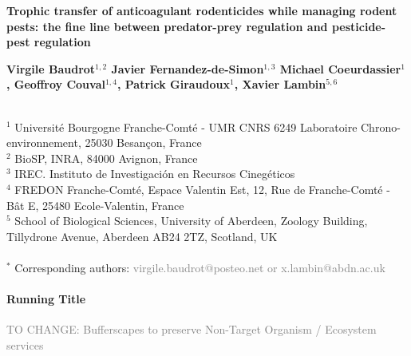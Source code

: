 \documentclass[11pt]{article}
\begin{document}
\begin{center}
	\Large\textbf{
	Trophic transfer of anticoagulant rodenticides while managing rodent pests: the fine line between predator-prey regulation and pesticide-pest regulation
}\par
\end{center}

\vspace{.5cm}

\begin{center}
	\large\textbf{
		Virgile Baudrot$^{1,2}$ 
		Javier Fernandez-de-Simon$^{1,3}$
		Michael Coeurdassier$^1$,
		Geoffroy Couval$^{1,4}$,
		Patrick Giraudoux$^1$,
		Xavier Lambin$^{5,6}$		
	}\par	
\end{center}
~\\
$^1$ Université Bourgogne Franche-Comté - UMR CNRS 6249 Laboratoire Chrono-environnement, 25030 Besançon, France\\
$^2$ BioSP, INRA, 84000 Avignon, France\\
$^3$ IREC. Instituto de Investigación en Recursos Cinegéticos\\
$^4$ FREDON Franche-Comté, Espace Valentin Est, 12, Rue de Franche-Comté - Bât E, 25480 Ecole-Valentin, France\\
$^5$ School of Biological Sciences, University of Aberdeen, Zoology Building, Tillydrone Avenue, Aberdeen AB24 2TZ, Scotland, UK\\
~\\
$^*$ Corresponding authors: \textcolor{gray}{virgile.baudrot@posteo.net or x.lambin@abdn.ac.uk}

\paragraph{Running Title} \textcolor{gray}{TO CHANGE: Bufferscapes to preserve Non-Target Organism / Ecosystem services}

\vspace{.5cm}
\end{document}
